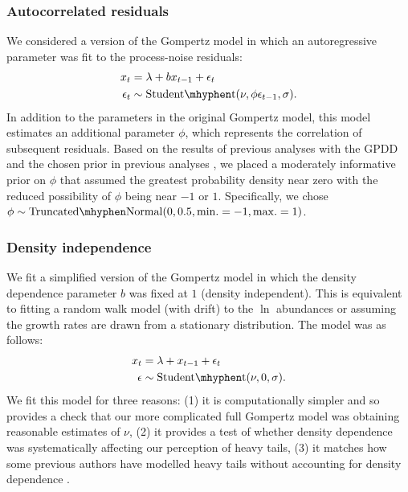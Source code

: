 \subsubsection{Autocorrelated residuals} We considered a version of the Gompertz
model in which an autoregressive parameter was fit to the process-noise
residuals: \begin{align} x_t &= \lambda + b x_{t-1} + \epsilon_t\\ \epsilon_t
&\sim \mathrm{Student\mhyphen t}(\nu, \phi \epsilon_{t-1}, \sigma). \end{align}
In addition to the parameters in the original Gompertz model, this model
estimates an additional parameter \(\phi\), which represents the correlation of
subsequent residuals. Based on the results of previous analyses with the
GPDD \citep{connors2014} and the chosen prior in previous
analyses \citep{thorson2014a}, we placed a moderately informative prior on
\(\phi\) that assumed the greatest probability density near zero with the
reduced possibility of \(\phi\) being near \(-1\) or \(1\). Specifically, we
chose \(\phi \sim \mathrm{Truncated\mhyphen Normal}(0, 0.5, \mathrm{min.} = -1,
\mathrm{max.} = 1)\).

\subsubsection{Density independence} We fit a simplified version of the
Gompertz model in which the density dependence parameter \(b\) was fixed at
\(1\) (density independent). This is equivalent to fitting a random walk model
(with drift) to the \(\ln\) abundances or assuming the growth rates are drawn
from a stationary distribution. The model was as follows:
\begin{align}
x_t &= \lambda + x_{t-1} + \epsilon_t\\
\epsilon &\sim \mathrm{Student\mhyphen t}(\nu, 0, \sigma).
\end{align}
We fit this model for three reasons: (1) it is computationally simpler and so
provides a check that our more complicated full Gompertz model was obtaining
reasonable estimates of \(\nu\), (2) it provides a test of whether density
dependence was systematically affecting our perception of heavy tails, (3) it
matches how some previous authors have modelled heavy tails without accounting
for density dependence \citep{segura2013}.


